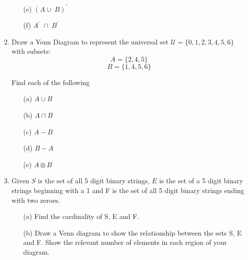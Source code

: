 \documentclass[]{article}
\begin{document}
\begin{enumerate}
\begin{multicols}{2}
\begin{itemize}
\item[(e)] $(A \cup\; B)^\prime\;$

\item[(f)] $A^\prime\; \cap\; B^\prime\;$
\end{itemize}
\end{multicols}


\item Draw a Venn Diagram to represent the universal set
$\mathcal{U} = \{0,1,2,3,4,5,6\}$ with subsets:\\
\[A = \{2,4,5\} \]
\[B = \{1,4,5,6\} \]

\noindent Find each of the following
\begin{multicols}{2}
\begin{itemize}
\item[(a)] $A \cup B $
\item[(b)] $A \cap B $
\item[(c)] $A-B$
\item[(d)] $B-A$
\item[(e)] $A \otimes B$
\end{itemize}
\end{multicols}



\item
Given $S$ is the set of all 5 digit binary strings, $E$ is the set of a 5 digit
binary strings beginning with a 1 and F is the set of all 5 digit binary strings ending
with two zeroes.
\begin{itemize}
\item[(a)] Find the cardinality of S, E and F.
\item[(b)] Draw a Venn diagram to show the relationship between the sets S, E and F.
Show the relevant number of elements in each region of your diagram.
\end{itemize}


\end{enumerate}
\end{document}
